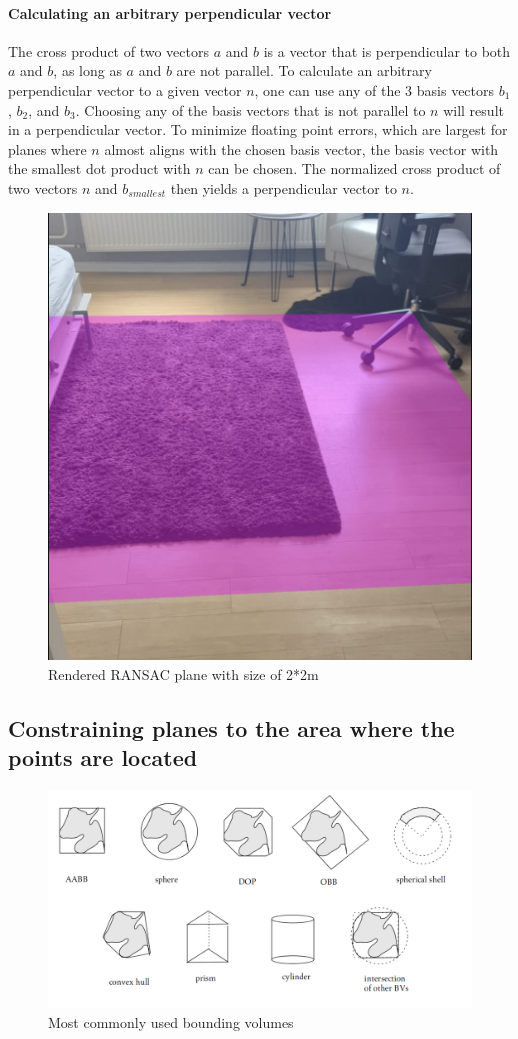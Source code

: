\paragraph{Calculating an arbitrary perpendicular vector}
The cross product of two vectors $a$ and $b$ is a vector that is perpendicular to both $a$ and $b$,
as long as $a$ and $b$ are not parallel.
To calculate an arbitrary perpendicular vector to a given vector $n$, one can use any of the 3 basis vectors ${b_1}$, ${b_2}$, and ${b_3}$.
Choosing any of the basis vectors that is not parallel to $n$ will result in a perpendicular vector.
To minimize floating point errors, which are largest for planes where $n$ almost aligns with the chosen basis vector,
the basis vector with the smallest dot product with $n$ can be chosen.
The normalized cross product of two vectors $n$ and $b_{smallest}$ then yields a perpendicular vector to $n$.

\begin{figure}[ht!]
    \centering
    \includegraphics[width=0.5\linewidth]{images/renderedPlane}
    \caption{Rendered RANSAC plane with size of 2*2m}
\end{figure}

\subsection{Constraining planes to the area where the points are located}

\begin{figure}[ht!]
    \centering
    \includegraphics[width=0.9\linewidth]{images/bounding-volumes}
    \caption{Most commonly used bounding volumes}
\end{figure}

